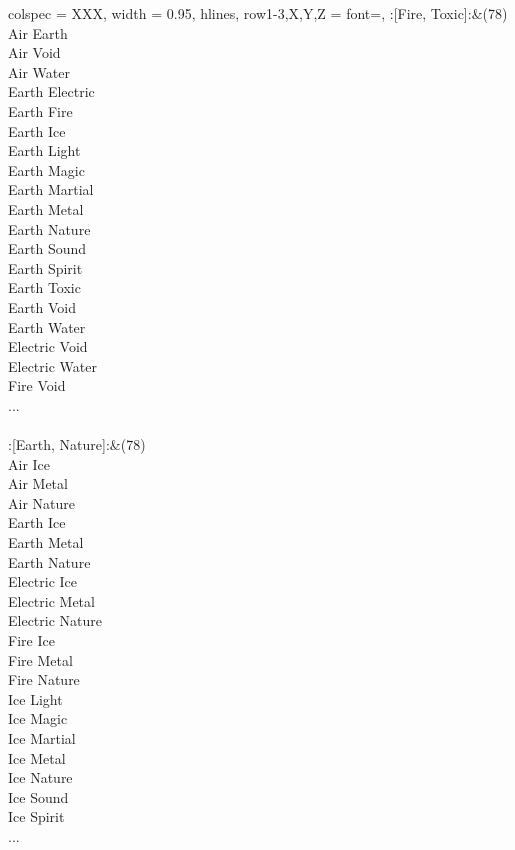 \begin{longtblr}[
	caption = {2v2 Defending Weak},
	label = {2v2-Defending-Weak},
]{
	colspec = {XXX}, width = 0.95\linewidth,
	hlines,
	row{1-3,X,Y,Z} = {font=\bfseries},
}
	:[Fire, Toxic]:&{(78)\\
	Air Earth \\
	Air Void \\
	Air Water \\
	Earth Electric \\
	Earth Fire \\
	Earth Ice \\
	Earth Light \\
	Earth Magic \\
	Earth Martial \\
	Earth Metal \\
	Earth Nature \\
	Earth Sound \\
	Earth Spirit \\
	Earth Toxic \\
	Earth Void \\
	Earth Water \\
	Electric Void \\
	Electric Water \\
	Fire Void \\
	...\\
	}\\

	:[Earth, Nature]:&{(78)\\
	Air Ice \\
	Air Metal \\
	Air Nature \\
	Earth Ice \\
	Earth Metal \\
	Earth Nature \\
	Electric Ice \\
	Electric Metal \\
	Electric Nature \\
	Fire Ice \\
	Fire Metal \\
	Fire Nature \\
	Ice Light \\
	Ice Magic \\
	Ice Martial \\
	Ice Metal \\
	Ice Nature \\
	Ice Sound \\
	Ice Spirit \\
	...\\
	}\\


\end{longtblr}
